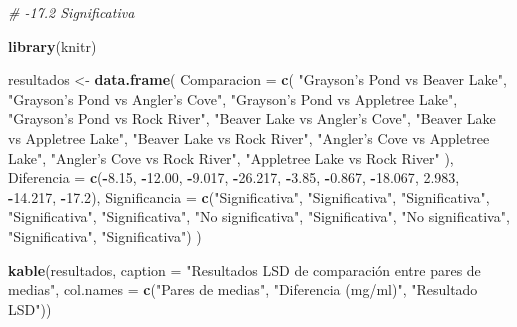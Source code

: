 \documentclass[
]{article}
\newenvironment{Shaded}{\begin{snugshade}}{\end{snugshade}}
\newcommand{\AttributeTok}[1]{\textcolor[rgb]{0.13,0.29,0.53}{#1}}
\newcommand{\CommentTok}[1]{\textcolor[rgb]{0.56,0.35,0.01}{\textit{#1}}}
\newcommand{\FloatTok}[1]{\textcolor[rgb]{0.00,0.00,0.81}{#1}}
\newcommand{\FunctionTok}[1]{\textcolor[rgb]{0.13,0.29,0.53}{\textbf{#1}}}
\newcommand{\NormalTok}[1]{#1}
\newcommand{\OtherTok}[1]{\textcolor[rgb]{0.56,0.35,0.01}{#1}}
\newcommand{\SpecialCharTok}[1]{\textcolor[rgb]{0.81,0.36,0.00}{\textbf{#1}}}
\newcommand{\StringTok}[1]{\textcolor[rgb]{0.31,0.60,0.02}{#1}}
\begin{document}
\begin{Shaded}
\begin{Highlighting}[]
\CommentTok{\# {-}17.2 Significativa}

\FunctionTok{library}\NormalTok{(knitr)}

\NormalTok{resultados }\OtherTok{\textless{}{-}} \FunctionTok{data.frame}\NormalTok{(}
  \AttributeTok{Comparacion =} \FunctionTok{c}\NormalTok{(}
    \StringTok{"Grayson’s Pond vs Beaver Lake"}\NormalTok{,}
    \StringTok{"Grayson’s Pond vs Angler’s Cove"}\NormalTok{,}
    \StringTok{"Grayson’s Pond vs Appletree Lake"}\NormalTok{,}
    \StringTok{"Grayson’s Pond vs Rock River"}\NormalTok{,}
    \StringTok{"Beaver Lake vs Angler’s Cove"}\NormalTok{,}
    \StringTok{"Beaver Lake vs Appletree Lake"}\NormalTok{,}
    \StringTok{"Beaver Lake vs Rock River"}\NormalTok{,}
    \StringTok{"Angler’s Cove vs Appletree Lake"}\NormalTok{,}
    \StringTok{"Angler’s Cove vs Rock River"}\NormalTok{,}
    \StringTok{"Appletree Lake vs Rock River"}
\NormalTok{  ),}
  \AttributeTok{Diferencia =} \FunctionTok{c}\NormalTok{(}\SpecialCharTok{{-}}\FloatTok{8.15}\NormalTok{, }\SpecialCharTok{{-}}\FloatTok{12.00}\NormalTok{, }\SpecialCharTok{{-}}\FloatTok{9.017}\NormalTok{, }\SpecialCharTok{{-}}\FloatTok{26.217}\NormalTok{, }\SpecialCharTok{{-}}\FloatTok{3.85}\NormalTok{, }\SpecialCharTok{{-}}\FloatTok{0.867}\NormalTok{, }\SpecialCharTok{{-}}\FloatTok{18.067}\NormalTok{, }\FloatTok{2.983}\NormalTok{, }\SpecialCharTok{{-}}\FloatTok{14.217}\NormalTok{, }\SpecialCharTok{{-}}\FloatTok{17.2}\NormalTok{),}
  \AttributeTok{Significancia =} \FunctionTok{c}\NormalTok{(}\StringTok{"Significativa"}\NormalTok{, }\StringTok{"Significativa"}\NormalTok{, }\StringTok{"Significativa"}\NormalTok{, }\StringTok{"Significativa"}\NormalTok{,}
                    \StringTok{"Significativa"}\NormalTok{, }\StringTok{"No significativa"}\NormalTok{, }\StringTok{"Significativa"}\NormalTok{,}
                    \StringTok{"No significativa"}\NormalTok{, }\StringTok{"Significativa"}\NormalTok{, }\StringTok{"Significativa"}\NormalTok{)}
\NormalTok{)}

\FunctionTok{kable}\NormalTok{(resultados, }\AttributeTok{caption =} \StringTok{"Resultados LSD de comparación entre pares de medias"}\NormalTok{,}
      \AttributeTok{col.names =} \FunctionTok{c}\NormalTok{(}\StringTok{"Pares de medias"}\NormalTok{, }\StringTok{"Diferencia (mg/ml)"}\NormalTok{, }\StringTok{"Resultado LSD"}\NormalTok{))}
\end{Highlighting}
\end{Shaded}
\end{document}
